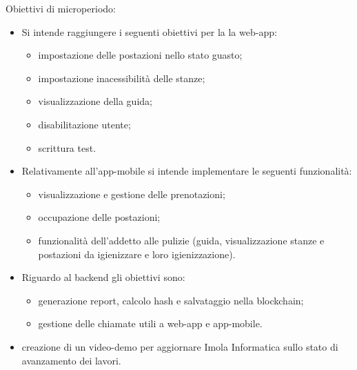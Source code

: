 Obiettivi di microperiodo:
\begin{itemize}
	\item Si intende raggiungere i seguenti obiettivi per la la web-app:
	\begin{itemize}
		\item impostazione delle postazioni nello stato guasto; 
		\item impostazione inacessibilità delle stanze;
		\item visualizzazione della guida;
		\item disabilitazione utente;
		\item scrittura test.
	\end{itemize}
	\item Relativamente all'app-mobile si intende implementare le seguenti funzionalità:
	\begin{itemize}
		\item visualizzazione e gestione delle prenotazioni;
		\item occupazione delle postazioni;
		\item funzionalità dell'addetto alle pulizie (guida, visualizzazione stanze e postazioni da igienizzare e loro igienizzazione).
	\end{itemize}
	\item Riguardo al backend gli obiettivi sono:
	\begin{itemize}
		\item generazione report, calcolo hash e salvataggio nella blockchain;
		\item gestione delle chiamate utili a web-app e app-mobile.
	\end{itemize}
\item creazione di un video-demo per aggiornare Imola Informatica sullo stato di avanzamento dei lavori.
\end{itemize}

